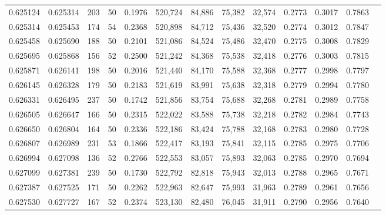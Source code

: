 \begin{tabular}{rrrrrrrrrrrrr}
0.625124 & 0.625314 &   203 &  50 &                                     0.1976 & 520,724 &  84,886 &  75,382 &  32,574 & 0.2773 & 0.3017 & 0.7863 \\
0.625314 & 0.625453 &   174 &  54 &                                     0.2368 & 520,898 &  84,712 &  75,436 &  32,520 & 0.2774 & 0.3012 & 0.7847 \\
0.625458 & 0.625690 &   188 &  50 &                                     0.2101 & 521,086 &  84,524 &  75,486 &  32,470 & 0.2775 & 0.3008 & 0.7829 \\
0.625695 & 0.625868 &   156 &  52 &                                     0.2500 & 521,242 &  84,368 &  75,538 &  32,418 & 0.2776 & 0.3003 & 0.7815 \\
0.625871 & 0.626141 &   198 &  50 &                                     0.2016 & 521,440 &  84,170 &  75,588 &  32,368 & 0.2777 & 0.2998 & 0.7797 \\
0.626145 & 0.626328 &   179 &  50 &                                     0.2183 & 521,619 &  83,991 &  75,638 &  32,318 & 0.2779 & 0.2994 & 0.7780 \\
0.626331 & 0.626495 &   237 &  50 &                                     0.1742 & 521,856 &  83,754 &  75,688 &  32,268 & 0.2781 & 0.2989 & 0.7758 \\
0.626505 & 0.626647 &   166 &  50 &                                     0.2315 & 522,022 &  83,588 &  75,738 &  32,218 & 0.2782 & 0.2984 & 0.7743 \\
0.626650 & 0.626804 &   164 &  50 &                                     0.2336 & 522,186 &  83,424 &  75,788 &  32,168 & 0.2783 & 0.2980 & 0.7728 \\
0.626807 & 0.626989 &   231 &  53 &                                     0.1866 & 522,417 &  83,193 &  75,841 &  32,115 & 0.2785 & 0.2975 & 0.7706 \\
0.626994 & 0.627098 &   136 &  52 &                                     0.2766 & 522,553 &  83,057 &  75,893 &  32,063 & 0.2785 & 0.2970 & 0.7694 \\
0.627099 & 0.627381 &   239 &  50 &                                     0.1730 & 522,792 &  82,818 &  75,943 &  32,013 & 0.2788 & 0.2965 & 0.7671 \\
0.627387 & 0.627525 &   171 &  50 &                                     0.2262 & 522,963 &  82,647 &  75,993 &  31,963 & 0.2789 & 0.2961 & 0.7656 \\
0.627530 & 0.627727 &   167 &  52 &                                     0.2374 & 523,130 &  82,480 &  76,045 &  31,911 & 0.2790 & 0.2956 & 0.7640 \\

\end{tabular}
